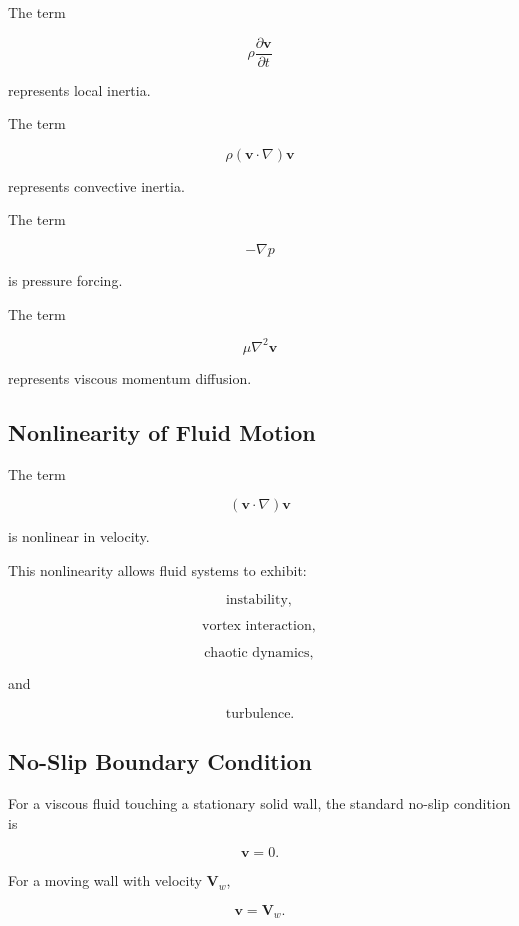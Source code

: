 The term

\[
\rho\frac{\partial\mathbf{v}}{\partial t}
\]

represents local inertia.

The term

\[
\boxed{
\rho(\mathbf{v}\cdot\nabla)\mathbf{v}
}
\]

represents convective inertia.

The term

\[
\boxed{
-\nabla p
}
\]

is pressure forcing.

The term

\[
\boxed{
\mu\nabla^2\mathbf{v}
}
\]

represents viscous momentum diffusion.

\subsection{Nonlinearity of Fluid Motion}
\label{subsec:fluid-nonlinearity}

The term

\[
\boxed{
(\mathbf{v}\cdot\nabla)\mathbf{v}
}
\]

is nonlinear in velocity.

This nonlinearity allows fluid systems to exhibit:

\[
\boxed{
\text{instability},
}
\]

\[
\boxed{
\text{vortex interaction},
}
\]

\[
\boxed{
\text{chaotic dynamics},
}
\]

and

\[
\boxed{
\text{turbulence}.
}
\]

\subsection{No-Slip Boundary Condition}
\label{subsec:no-slip-condition}

For a viscous fluid touching a stationary solid wall, the standard no-slip
condition is

\[
\boxed{
\mathbf{v}=0.
}
\]

For a moving wall with velocity \(\mathbf{V}_w\),

\[
\boxed{
\mathbf{v}
=
\mathbf{V}_w.
}
\]

